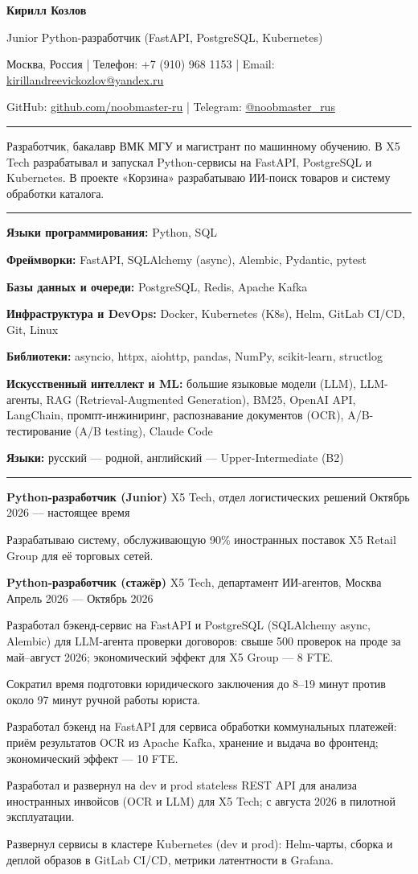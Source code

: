 \documentclass[10pt,a4paper]{article}
\newcommand{\cvsection}[1]{%
  \vspace{5pt}{\large\bfseries #1}\par\vspace{2pt}\hrule\vspace{4pt}}
\newcommand{\cventry}[3]{%
  \textbf{#1} \textbar{} #3 \textbar{} #2\par\vspace{1pt}}
\newcommand{\skilllangs}{\textbf{Языки программирования:} Python, SQL\par}
\newcommand{\skillai}{\textbf{Искусственный интеллект и ML:} большие языковые модели (LLM), LLM-агенты,
RAG (Retrieval-Augmented Generation), BM25, OpenAI API, LangChain, промпт-инжиниринг,
распознавание документов (OCR), A/B-тестирование (A/B testing), Claude Code\par}
\newcommand{\skillframeworks}{\textbf{Фреймворки:} FastAPI, SQLAlchemy (async), Alembic, Pydantic, pytest\par}
\newcommand{\skilllibs}{\textbf{Библиотеки:} asyncio, httpx, aiohttp, pandas, NumPy, scikit-learn, structlog\par}
\newcommand{\skilldb}{\textbf{Базы данных и очереди:} PostgreSQL, Redis, Apache Kafka\par}
\newcommand{\skillinfra}{\textbf{Инфраструктура и DevOps:} Docker, Kubernetes (K8s), Helm, GitLab CI/CD, Git, Linux\par}
\newcommand{\skillhuman}{\textbf{Языки:} русский --- родной, английский --- Upper-Intermediate (B2)}
\begin{document}
{\LARGE\bfseries Кирилл Козлов}\par\vspace{3pt}
Junior Python-разработчик (FastAPI, PostgreSQL, Kubernetes)\par\vspace{3pt}
Москва, Россия | Телефон: +7 (910) 968 1153 | Email: \href{mailto:kirillandreevickozlov@yandex.ru}{kirillandreevickozlov@yandex.ru}\par
GitHub: \href{https://github.com/noobmaster-ru}{github.com/noobmaster-ru} | Telegram: \href{https://t.me/noobmaster_rus}{@noobmaster\_rus}

\cvsection{О себе}
Разработчик, бакалавр ВМК МГУ и магистрант по машинному обучению. В X5 Tech разрабатывал и запускал Python-сервисы на FastAPI, PostgreSQL и Kubernetes. В проекте «Корзина» разрабатываю ИИ-поиск товаров и систему обработки каталога.

\cvsection{Ключевые навыки}
\skilllangs
\skillframeworks\skilldb\skillinfra\skilllibs\skillai
\skillhuman

\cvsection{Опыт работы}
\cventry{Python-разработчик (Junior)}{Октябрь 2026 --- настоящее время}{X5 Tech, отдел логистических решений}
\begin{cvitems}
    \item Разрабатываю систему, обслуживающую 90\% иностранных поставок X5 Retail Group для её торговых сетей.
\end{cvitems}
\vspace{2pt}

\cventry{Python-разработчик (стажёр)}{Апрель 2026 --- Октябрь 2026}{X5 Tech, департамент ИИ-агентов, Москва}
\begin{cvitems}
%
    \item Разработал бэкенд-сервис на FastAPI и PostgreSQL (SQLAlchemy async, Alembic) для LLM-агента проверки договоров: свыше 500 проверок на проде за май--август 2026; экономический эффект для X5 Group --- 8 FTE.
    \item Сократил время подготовки юридического заключения до 8--19 минут против около 97 минут ручной работы юриста.
    \item Разработал бэкенд на FastAPI для сервиса обработки коммунальных платежей: приём результатов OCR из Apache Kafka, хранение и выдача во фронтенд; экономический эффект --- 10 FTE.
    \item Разработал и развернул на dev и prod stateless REST API для анализа иностранных инвойсов (OCR и LLM) для X5 Tech; с августа 2026 в пилотной эксплуатации.
    \item Развернул сервисы в кластере Kubernetes (dev и prod): Helm-чарты, сборка и деплой образов в GitLab CI/CD, метрики латентности в Grafana.%

\end{cvitems}
\end{document}
